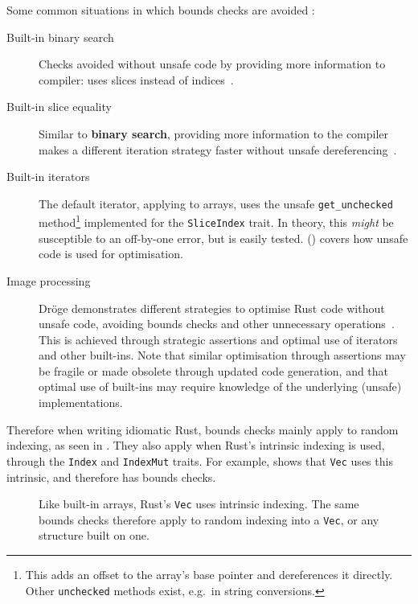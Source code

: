 \documentclass[dissertation.tex]{subfiles}
\begin{document}
Some common situations in which bounds checks are avoided :

\begin{description}
    \item[Built-in binary search] Checks avoided without unsafe code by
    providing more information to compiler: uses slices instead of
    indices~\cite{rust-pr-binarysearch}.
    \item[Built-in slice equality] Similar to \textbf{binary search},
    providing more information to the compiler makes a different
    iteration strategy faster without unsafe dereferencing~\cite{rust-pr-slice-partialeq}.
    \item[Built-in iterators] The default iterator, applying to arrays,
    uses the unsafe \texttt{get\_unchecked} method\footnote{This adds an
    offset to the array's base pointer and dereferences it directly.
    Other \texttt{unchecked} methods exist, e.g.\ in string
    conversions.} implemented for the \texttt{SliceIndex} trait.
    In theory, this \emph{might} be susceptible to an off-by-one error,
    but is easily tested.
    ()
     covers how unsafe code is used for optimisation.
    \item[Image processing] Dr\"oge demonstrates different strategies to
    optimise Rust code without unsafe code, avoiding bounds checks and
    other unnecessary operations~\cite{droge-opt}.
    This is achieved through strategic assertions and optimal use of
    iterators and other built-ins.
    Note that similar optimisation through assertions may be fragile or
    made obsolete through updated code generation, and that optimal use
    of built-ins may require knowledge of the underlying (unsafe)
    implementations.
\end{description}

Therefore when writing idiomatic Rust, bounds checks mainly apply to
random indexing, as seen in .
They also apply when Rust's intrinsic indexing is used, through the
\texttt{Index} and \texttt{IndexMut} traits.
For example,  shows that \texttt{Vec} uses
this intrinsic, and therefore has bounds checks.

\begin{figure}[ht]
    
    \caption{
        Like built-in arrays, Rust's \texttt{Vec} uses intrinsic
        indexing.
        The same bounds checks therefore apply to random indexing into a
        \texttt{Vec}, or any structure built on one.
    }
    \label{lst:rust-vec-index}
\end{figure}
\end{document}

